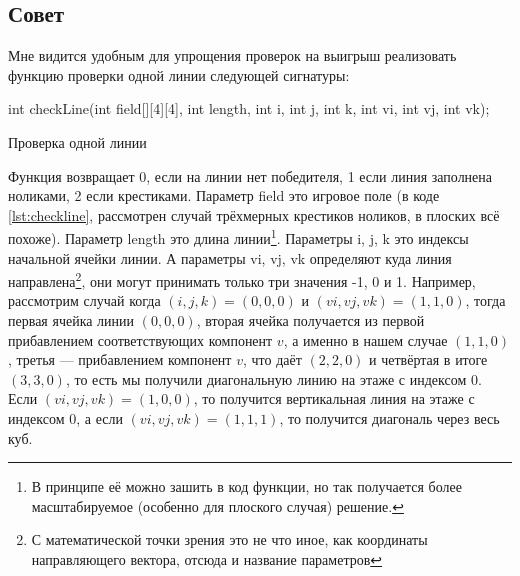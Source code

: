 \documentclass[12pt]{article}
\begin{document}
\subsection{Совет}
Мне видится удобным для упрощения проверок на выигрыш реализовать функцию проверки одной линии следующей сигнатуры:
\begin{listing}[H]
\begin{center}
\begin{ccode}
int checkLine(int field[][4][4], int length, int i, int j, int k,
                int vi, int vj, int vk);
\end{ccode}
\end{center}
\caption{Проверка одной линии}
\label{lst:checkline}
\end{listing}
Функция возвращает 0, если на линии нет победителя, 1 если линия заполнена ноликами, 2 если крестиками. Параметр field
это игровое поле (в коде \ref{lst:checkline}, рассмотрен случай трёхмерных крестиков ноликов, в плоских всё похоже).
Параметр length это длина линии\footnote{В принципе её можно зашить в код функции, но так получается более
масштабируемое (особенно для плоского случая) решение.}. Параметры i, j, k это индексы начальной ячейки линии. А
параметры vi, vj, vk определяют куда линия направлена\footnote{С математической точки зрения это не что иное, как
координаты направляющего вектора, отсюда и название параметров}, они могут принимать только три значения -1, 0 и 1.
Например, рассмотрим случай когда $(i, j, k) = (0, 0, 0)$ и $(vi, vj, vk) = (1, 1, 0)$, тогда первая ячейка линии $(0,
0, 0)$, вторая ячейка получается из первой прибавлением соответствующих компонент $v$, а именно в нашем случае $(1, 1,
0)$, третья --- прибавлением компонент $v$, что даёт $(2, 2, 0)$ и четвёртая в итоге $(3, 3, 0)$, то есть мы получили
диагональную линию на этаже с индексом 0. Если $(vi, vj, vk) = (1, 0, 0)$, то получится вертикальная линия на этаже с
индексом 0, а если $(vi, vj, vk) = (1, 1, 1)$, то получится диагональ через весь куб.
\end{document}
